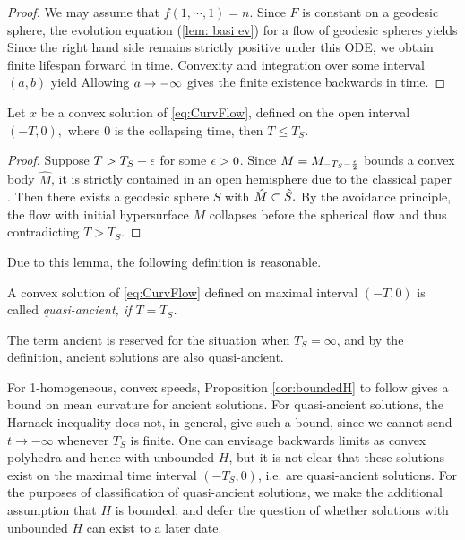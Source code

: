 \documentclass{amsart}
\begin{document}
\begin{proof}
We may assume that $f(1,\cdots,1)=n.$
Since $F$ is constant on a geodesic sphere, the evolution equation (\ref{lem: basi ev}) for a flow of geodesic spheres yields
Since the right hand side remains strictly positive under this ODE, we obtain finite lifespan forward in time.
Convexity and integration over some interval $(a,b)$ yield
Allowing $a\rightarrow-\infty$ gives the finite existence backwards in time.
\end{proof}

\begin{lemma}
Let $x$ be a convex solution of \eqref{eq:CurvFlow}, defined on the open interval $(-T,0),$ where $0$ is the collapsing time, then $T\leq T_S.$
\end{lemma}

\begin{proof}
Suppose $T>T_S+\epsilon$ for some $\epsilon>0$. Since $M=M_{-T_S-\frac{\epsilon}{2}}$ bounds a convex body $\hat{M}$, it is strictly contained in an open hemisphere due to the classical paper \cite{CarmoWarner:/1970}. Then there exists a geodesic sphere $S$ with $\hat{M}\subset\hat{S}.$ By the avoidance principle, the flow with initial hypersurface $M$ collapses before the spherical flow and thus contradicting $T>T_S$.
\end{proof}

Due to this lemma, the following definition is reasonable.

\begin{defn}
A convex solution of \eqref{eq:CurvFlow} defined on maximal interval $(-T,0)$ is called \it{quasi-ancient}, if $T=T_S$.
\end{defn}

The term ancient is reserved for the situation when \(T_S=\infty\), and by the definition, ancient solutions are also quasi-ancient.

For 1-homogeneous, convex speeds, Proposition \ref{cor:boundedH} to follow gives a bound on mean curvature for ancient solutions. For quasi-ancient solutions, the Harnack inequality does not, in general, give such a bound, since we cannot send \(t \to -\infty\) whenever \(T_S\) is finite. One can envisage backwards limits as convex polyhedra and hence with unbounded \(H\), but it is not clear that these solutions exist on the maximal time interval \((-T_S, 0)\), i.e. are quasi-ancient solutions. For the purposes of classification of quasi-ancient solutions, we make the additional assumption that \(H\) is bounded, and defer the question of whether solutions with unbounded \(H\) can exist to a later date.
\end{document}
